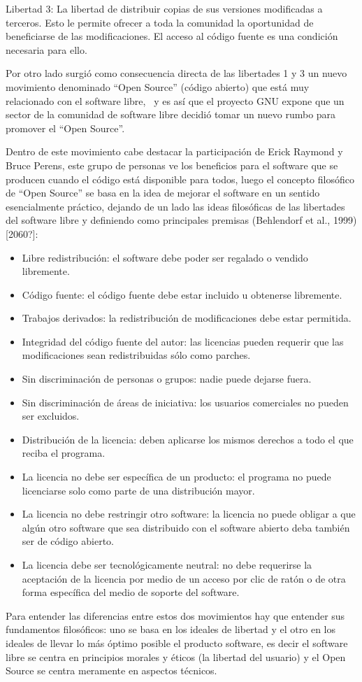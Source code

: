 Libertad 3: La libertad de distribuir copias de sus versiones modificadas a terceros. Esto le permite ofrecer a toda la comunidad la oportunidad de beneficiarse de las modificaciones. El acceso al código fuente es una condición necesaria para ello.

Por otro lado surgió como consecuencia directa de las libertades 1 y 3 un nuevo movimiento denominado ``Open Source'' (código abierto) que está muy relacionado con el software libre, \ y es así que el proyecto GNU expone que un sector de la comunidad de software libre decidió tomar un nuevo rumbo para promover el ``Open Source''.

Dentro de este movimiento cabe destacar la participación de Erick Raymond y Bruce Perens, este grupo de personas ve los beneficios para el software que se producen cuando el código está disponible para todos, luego el concepto filosófico de ``Open Source'' se basa en la idea de mejorar el software en un sentido esencialmente práctico, dejando de un lado las ideas filosóficas de las libertades del software libre y definiendo como principales premisas (Behlendorf et al., 1999)[2060?]:

\begin{itemize}
	\item Libre redistribución: el software debe poder ser regalado o vendido libremente.
	\item Código fuente: el código fuente debe estar incluido u obtenerse libremente.
	\item Trabajos derivados: la redistribución de modificaciones debe estar permitida.
	\item Integridad del código fuente del autor: las licencias pueden requerir que las modificaciones sean redistribuidas sólo como parches.
	\item Sin discriminación de personas o grupos: nadie puede dejarse fuera.
	\item Sin discriminación de áreas de iniciativa: los usuarios comerciales no pueden ser excluidos.
	\item Distribución de la licencia: deben aplicarse los mismos derechos a todo el que reciba el programa.
	\item La licencia no debe ser específica de un producto: el programa no puede licenciarse solo como parte de una distribución mayor.
	\item La licencia no debe restringir otro software: la licencia no puede obligar a que algún otro software que sea distribuido con el software abierto deba también ser de código abierto.
	\item La licencia debe ser tecnológicamente neutral: no debe requerirse la aceptación de la licencia por medio de un acceso por clic de ratón o de otra forma específica del medio de soporte del software.
\end{itemize}
Para entender las diferencias entre estos dos movimientos hay que entender sus fundamentos filosóficos: uno se basa en los ideales de libertad y el otro en los ideales de llevar lo más óptimo posible el producto software, es decir el software libre se centra en principios morales y éticos (la libertad del usuario) y el Open Source se centra meramente en aspectos técnicos.


